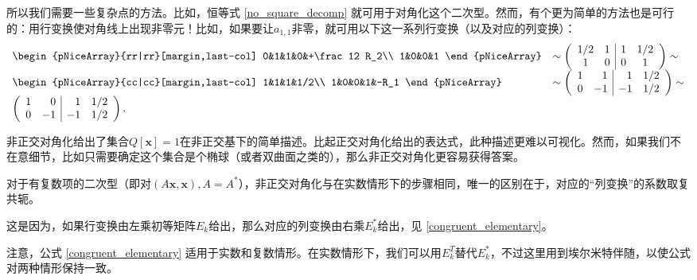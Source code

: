 所以我们需要一些复杂点的方法。比如，恒等式 \eqref{no_square_decomp} 就可用于对角化这个二次型。然而，有个更为简单的方法也是可行的：用行变换使对角线上出现非零元！比如，如果要让$a_{1,1}$非零，就可用以下这一系列行变换（以及对应的列变换）：
\[
\begin{array}{ll}
    \begin{pNiceArray}{rr|rr}[margin,last-col]
      0&1&1&0&+\frac12 R_2\\
      1&0&0&1
    \end{pNiceArray}  &\sim \left(
    \begin{array}{cc|cc}
      1/2 & 1 & 1 & 1/2\\
      1&0&0&1
    \end{array}
    \right)\sim\\
    \begin{pNiceArray}{cc|cc}[margin,last-col]
      1&1&1&1/2\\
      1&0&0&1&-R_1
    \end{pNiceArray}  &\sim \left(
    \begin{array}{rr|rc}
      1&1&1&1/2\\
      0&-1&-1&1/2
    \end{array}
    \right)\sim\\
    \left(\begin{array}{rr|rc}
      1&0&1&1/2\\
      0&-1&-1&1/2
    \end{array}\right) .&
\end{array}
\]

\begin{remark*}
    非正交对角化给出了集合$Q[\mathbf{x}]=1$在非正交基下的简单描述。比起正交对角化给出的表达式，此种描述更难以可视化。然而，如果我们不在意细节，比如只需要确定这个集合是个椭球（或者双曲面之类的），那么非正交对角化更容易获得答案。
\end{remark*}

\begin{remark}\label{remark:conjugate_of_row_operation}
    对于有复数项的二次型（即对$(A\mathbf{x},\mathbf{x}),A=A^*$），非正交对角化与在实数情形下的步骤相同，唯一的区别在于，对应的“列变换”的系数取复共轭。

    这是因为，如果行变换由左乘初等矩阵$E_k$给出，那么对应的列变换由右乘$E_k^*$给出，见 \eqref{congruent_elementary}。

    注意，公式 \eqref{congruent_elementary} 适用于实数和复数情形。在实数情形下，我们可以用$E_k^T$替代$E_k^*$，不过这里用到埃尔米特伴随，以使公式对两种情形保持一致。
\end{remark}

